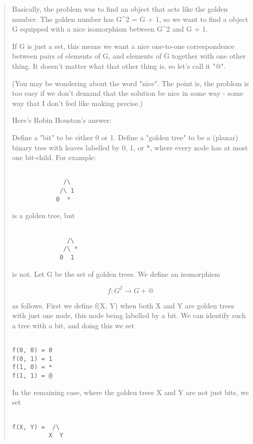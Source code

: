 \begin{quote}
Basically, the problem was to find an object that acts like the golden 
number.  The golden number has 
G^{2} = G + 1, so we want to find
a object G equipped with a nice isomorphism between G^{2} and
G + 1.

If G is just a set, this means we want a nice one-to-one correspondence between 
pairs of elements of G, and elements of G together with one other thing.
It doesn't matter what that other thing is, so let's call it "@".

(You may be wondering about the word "nice".  The point is, the 
problem
is too easy if we don't demand that the solution be nice in some way -
some way that I don't feel like making precise.)

Here's Robin Houston's answer:

Define a "bit" to be either 0 or 1.  Define a "golden tree" to be a 
(planar) binary tree with leaves labelled by 0, 1, or *, where every 
node has at most one bit-child.  For example:


\begin{verbatim}

              /\   
             /\ 1 
            0  * 
\end{verbatim}
    
is a golden tree, but

\begin{verbatim}

               /\   
              /\ *
             0  1
\end{verbatim}
    
is not.
Let G be the set of golden trees.  We define an isomorphism 


$$

f: G^{2} \to  G + {@} 
$$
    
as follows.  First we define f(X, Y) when both X and Y are golden
trees with just one node, this node being labelled by a bit.  We 
can identify such a tree with a bit, and doing this we set


\begin{verbatim}

f(0, 0) = 0
f(0, 1) = 1
f(1, 0) = *
f(1, 1) = @
\end{verbatim}
    
In the remaining case, where the golden trees X and Y are not just bits,
we set


\begin{verbatim}

f(X, Y) =  /\ 
          X  Y
\end{verbatim}
    

\end{quote}
